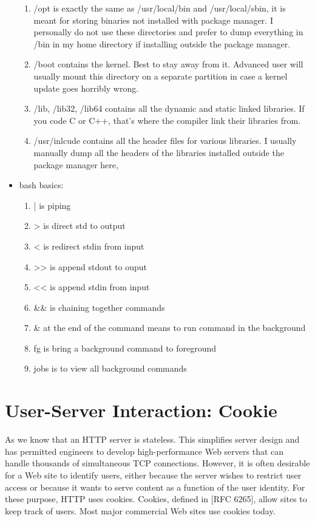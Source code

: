 \documentclass[fancy,11pt,titlestyle=display]{style/elegantbook}
\begin{document}
\begin{itemize}
\begin{enumerate}
	\item /opt is exactly the same as /usr/local/bin and /usr/local/sbin, it is meant for storing binaries not installed with package manager. I personally do not use these directories and prefer to dump everything in /bin in my home directory if installing outside the package manager.  
	\item /boot contains the kernel. Best to stay away from it. Advanced user will usually mount this directory on a separate partition in case a kernel update goes horribly wrong. 
	\item /lib, /lib32, /lib64 contains all the dynamic and static linked libraries. If you code C or C++, that's where the compiler link their libraries from. 
	\item /usr/inlcude contains all the header files for various libraries. I usually manually dump all the headers of the libraries installed outside the package manager here, 
    \end{enumerate}
\item bash basics: 
    \begin{enumerate}
	\item | is piping
	\item > is direct std to output
	\item < is redirect stdin from input
	\item >> is append stdout to ouput
	\item << is append stdin from input
	\item \&\& is chaining together commands
	\item \& at the end of the command means to run command in the background
	\item fg is bring a background command to foreground
	\item jobs is to view all background commands 
    \end{enumerate}
\end{itemize}







\chapter{User-Server Interaction: Cookie}
As we know that an HTTP server is stateless. This simplifies server design
and has permitted engineers to develop high-performance Web servers that can handle thousands of simultaneous TCP connections. However, it is often desirable for a Web site to identify users, either because the server wishes to restrict user access or because it wants to serve content as a function of the user identity. For these purpose, HTTP uses cookies. Cookies, defined in [RFC 6265],
allow sites to keep track of users. Most major commercial Web sites use cookies today.
\end{document}

